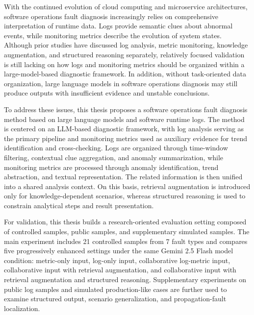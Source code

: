 
With the continued evolution of cloud computing and microservice architectures, software operations fault diagnosis increasingly relies on comprehensive interpretation of runtime data. Logs provide semantic clues about abnormal events, while monitoring metrics describe the evolution of system states. Although prior studies have discussed log analysis, metric monitoring, knowledge augmentation, and structured reasoning separately, relatively focused validation is still lacking on how logs and monitoring metrics should be organized within a large-model-based diagnostic framework. In addition, without task-oriented data organization, large language models in software operations diagnosis may still produce outputs with insufficient evidence and unstable conclusions.

To address these issues, this thesis proposes a software operations fault diagnosis method based on large language models and software runtime logs. The method is centered on an LLM-based diagnostic framework, with log analysis serving as the primary pipeline and monitoring metrics used as auxiliary evidence for trend identification and cross-checking. Logs are organized through time-window filtering, contextual clue aggregation, and anomaly summarization, while monitoring metrics are processed through anomaly identification, trend abstraction, and textual representation. The related information is then unified into a shared analysis context. On this basis, retrieval augmentation is introduced only for knowledge-dependent scenarios, whereas structured reasoning is used to constrain analytical steps and result presentation.

For validation, this thesis builds a research-oriented evaluation setting composed of controlled samples, public samples, and supplementary simulated samples. The main experiment includes 21 controlled samples from 7 fault types and compares five progressively enhanced settings under the same Gemini 2.5 Flash model condition: metric-only input, log-only input, collaborative log-metric input, collaborative input with retrieval augmentation, and collaborative input with retrieval augmentation and structured reasoning. Supplementary experiments on public log samples and simulated production-like cases are further used to examine structured output, scenario generalization, and propagation-fault localization.

